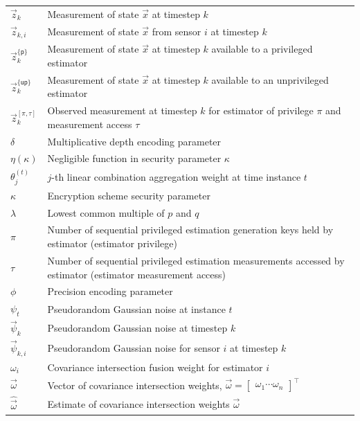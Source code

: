 \documentclass[oneside]{scrbook}
\theoremstyle{definition}
\theoremstyle{definition}
\theoremstyle{remark}
\begin{document}
\begin{longtable}{p{}p{}}
    $\vec{z}_k$ & Measurement of state $\vec{x}$ at timestep $k$\\
    $\vec{z}_{k,i}$ & Measurement of state $\vec{x}$ from sensor $i$ at timestep $k$\\
    $\vec{z}_k^{\{\mathsf{p}\}}$ & Measurement of state $\vec{x}$ at timestep $k$ available to a privileged estimator\\
    $\vec{z}_k^{\{\mathsf{up}\}}$ & Measurement of state $\vec{x}$ at timestep $k$ available to an unprivileged estimator\\
    $\vec{z}^{[\pi,\tau]}_k$ & Observed measurement at timestep $k$ for estimator of privilege $\pi$ and measurement access $\tau$\\
    $\delta$ & Multiplicative depth encoding parameter\\
    $\eta(\kappa)$ & Negligible function in security parameter $\kappa$\\
    $\theta^{(t)}_j$ & $j$-th linear combination aggregation weight at time instance $t$\\
    $\kappa$ & Encryption scheme security parameter\\
    $\lambda$ & Lowest common multiple of $p$ and $q$\\
    $\pi$ & Number of sequential privileged estimation generation keys held by estimator (estimator privilege)\\
    $\tau$ & Number of sequential privileged estimation measurements accessed by estimator (estimator measurement access)\\
    $\phi$ & Precision encoding parameter\\
    $\psi_t$ & Pseudorandom Gaussian noise at instance $t$\\
    $\vec{\psi}_k$ & Pseudorandom Gaussian noise at timestep $k$\\
    $\vec{\psi}_{k,i}$ & Pseudorandom Gaussian noise for sensor $i$ at timestep $k$\\
    $\omega_i$ & Covariance intersection fusion weight for estimator $i$\\
    $\vec{\omega}$ & Vector of covariance intersection weights, $\vec{\omega}=\begin{bmatrix}\omega_1\cdots\omega_n\end{bmatrix}^\top$\\
    $\hat{\vec{\omega}}$ & Estimate of covariance intersection weights $\vec{\omega}$
\end{longtable}
\end{document}
